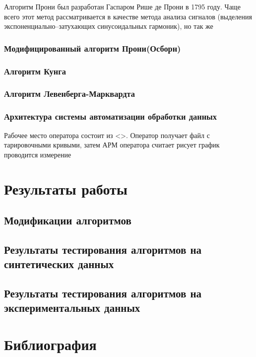 \documentclass[a4paper,10pt]{article}
\begin{document}
Алгоритм Прони был разработан Гаспаром Рише де Прони в 1795 году. Чаще всего этот метод рассматривается в качестве метода анализа сигналов (выделения экспоненциально--затухающих
синусоидальных гармоник), но так же 
\subsubsection{Модифицированный алгоритм Прони(Осборн)}

\subsubsection{Алгоритм Кунга}

\subsubsection{Алгоритм Левенберга-Марквардта}

\subsubsection{Архитектура системы автоматизации обработки данных}

Рабочее место оператора состоит из <>. Оператор получает файл с тарировочными кривыми, затем АРМ оператора считает рисует график проводится измерение


\section{Результаты работы}

\subsection{Модификации алгоритмов}

\subsection{Результаты тестирования алгоритмов на синтетических данных}

\subsection{Результаты тестирования алгоритмов на экспериментальных данных}

\section{Библиография}


\end{document}
